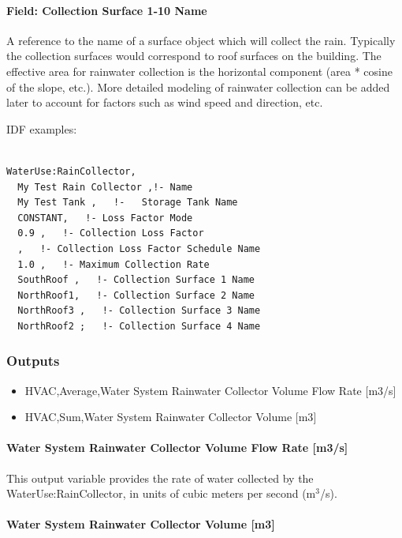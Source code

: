 \paragraph{Field: Collection Surface 1-10 Name}\label{field-collection-surface-1-10-name}

A reference to the name of a surface object which will collect the rain. Typically the collection surfaces would correspond to roof surfaces on the building. The effective area for rainwater collection is the horizontal component (area * cosine of the slope, etc.). More detailed modeling of rainwater collection can be added later to account for factors such as wind speed and direction, etc.

IDF examples:

\begin{lstlisting}

WaterUse:RainCollector,
  My Test Rain Collector ,!- Name
  My Test Tank ,   !-   Storage Tank Name
  CONSTANT,   !- Loss Factor Mode
  0.9 ,   !- Collection Loss Factor
  ,   !- Collection Loss Factor Schedule Name
  1.0 ,   !- Maximum Collection Rate
  SouthRoof ,   !- Collection Surface 1 Name
  NorthRoof1,   !- Collection Surface 2 Name
  NorthRoof3 ,   !- Collection Surface 3 Name
  NorthRoof2 ;   !- Collection Surface 4 Name
\end{lstlisting}

\subsubsection{Outputs}\label{outputs-3-023}

\begin{itemize}
\item
  HVAC,Average,Water System Rainwater Collector Volume Flow Rate {[}m3/s{]}
\item
  HVAC,Sum,Water System Rainwater Collector Volume {[}m3{]}
\end{itemize}

\paragraph{Water System Rainwater Collector Volume Flow Rate {[}m3/s{]}}\label{water-system-rainwater-collector-volume-flow-rate-m3s}

This output variable provides the rate of water collected by the WaterUse:RainCollector, in units of cubic meters per second (m\(^{3}\)/s).

\paragraph{Water System Rainwater Collector Volume {[}m3{]}}\label{water-system-rainwater-collector-volume-m3}

